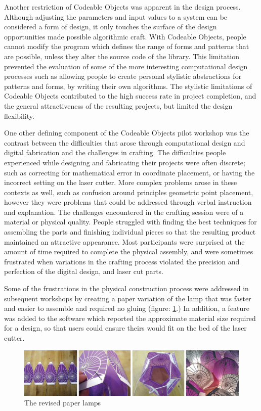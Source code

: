 Another restriction of Codeable Objects was apparent in the design process. Although adjusting the parameters and input values to a system can be considered a form of design, it only touches the surface of the design opportunities made possible algorithmic craft. With Codeable Objects, people cannot modify the program which defines the range of forms and patterns that are possible, unless they alter the source code of the library. This limitation prevented the evaluation of some of the more interesting computational design processes such as allowing people to create personal stylistic abstractions for patterns and forms, by writing their own algorithms. The stylistic limitations of Codeable Objects contributed to the high success rate in project completion, and the general attractiveness of the resulting projects, but limited the design flexibility. 

One other defining component of the Codeable Objects pilot workshop was the contrast between the difficulties that arose through computational design and digital fabrication and the challenges in crafting. The difficulties people experienced while designing and fabricating their projects were often discrete;  such as correcting for mathematical error in coordinate placement, or having the incorrect setting on the laser cutter. More complex problems arose in these contexts as well, such as confusion around principles geometric point placement, however they were problems that could be addressed through verbal instruction and explanation. The challenges encountered in the crafting session were of a material or physical quality.  People struggled with finding the best techniques for assembling the parts and finishing individual pieces so that the resulting product maintained an attractive appearance. Most participants were surprised at the amount of time required to complete the physical assembly, and were sometimes frustrated when variations in the crafting process violated the precision and perfection of the digital design, and laser cut parts. 

Some of the frustrations in the physical construction process were addressed in subsequent workshops by creating a paper variation of the lamp that was faster and easier to assemble and required no gluing (figure: \ref{fig:paper_lamp}.) In addition, a feature was added to the software which reported the approximate material size required for a design, so that users could ensure theirs would fit on the bed of the laser cutter. 
\begin{center}
\begin{figure}[h!]
\includegraphics[width=\columnwidth]{images/paper_lamps.png}
\caption{The revised paper lamps}
\label{fig:paper_lamp}
\end{figure}
\end{center}

